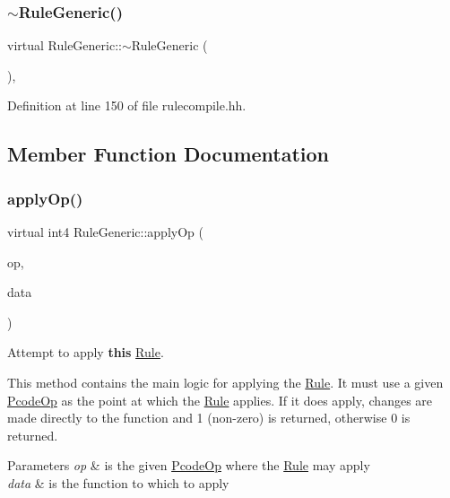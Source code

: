 \subsubsection{\texorpdfstring{$\sim$RuleGeneric()}{~RuleGeneric()}}
{\footnotesize\ttfamily virtual Rule\+Generic\+::$\sim$\+Rule\+Generic (\begin{DoxyParamCaption}\item[{void}]{ }\end{DoxyParamCaption})\hspace{0.3cm}{\ttfamily [inline]}, {\ttfamily [virtual]}}



Definition at line 150 of file rulecompile.\+hh.



\subsection{Member Function Documentation}
\mbox{\label{class_rule_generic_a418ffba68e1d81dd69a70752617b7ebb}} 
\subsubsection{\texorpdfstring{applyOp()}{applyOp()}}
{\footnotesize\ttfamily virtual int4 Rule\+Generic\+::apply\+Op (\begin{DoxyParamCaption}\item[{\mbox{\hyperlink{class_pcode_op}{Pcode\+Op}} $\ast$}]{op,  }\item[{\mbox{\hyperlink{class_funcdata}{Funcdata}} \&}]{data }\end{DoxyParamCaption})\hspace{0.3cm}{\ttfamily [virtual]}}



Attempt to apply {\bfseries{this}} \mbox{\hyperlink{class_rule}{Rule}}. 

This method contains the main logic for applying the \mbox{\hyperlink{class_rule}{Rule}}. It must use a given \mbox{\hyperlink{class_pcode_op}{Pcode\+Op}} as the point at which the \mbox{\hyperlink{class_rule}{Rule}} applies. If it does apply, changes are made directly to the function and 1 (non-\/zero) is returned, otherwise 0 is returned. 
\begin{DoxyParams}{Parameters}
{\em op} & is the given \mbox{\hyperlink{class_pcode_op}{Pcode\+Op}} where the \mbox{\hyperlink{class_rule}{Rule}} may apply \\
\hline
{\em data} & is the function to which to apply \\
\hline
\end{DoxyParams}


